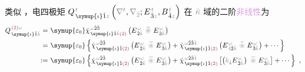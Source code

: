 类似 ，电四极矩 $Q^{\;\!\mathcolor{gray}{t}}_{\;\! \symup{\iota} \hat{1} \mathcolor{gray}{z}} \left( \mathcolor{gray}{\nabla^t}, \mathcolor{gray}{\nabla_{\hat{2}}} ; E^{\;\!\mathcolor{gray}{t}}_{\;\! \hat{3}\mathcolor{gray}{z}}, B^{\;\!\mathcolor{gray}{t}}_{\;\! \hat{4}\mathcolor{gray}{z}} \right)$ 在 $\mathcolor{gray}{\bar{\kappa}}$ 域的二阶\textcolor{Plum}{非线性}为
\begin{subequations}
\begin{align}
	Q^{\;\! \textcolor{Maroon}{(2)} \mathcolor{gray}{\omega}}_{\;\! \symup{\iota} \hat{1} \mathcolor{gray}{\bar{k}}} =&~ {\symup{\varepsilon_0}} \dot{\chi}^{\;\! \mathcolor{gray}{\omega} \hat{2} \hat{3}}_{\;\! \symup{\iota} \hat{1} \mathcolor{gray}{\bar{k}} \textcolor{Maroon}{(2)}} \left( E^{\;\!\mathcolor{gray}{\omega}}_{\;\! \hat{2} \mathcolor{gray}{\bar{k}}} ~\mathcolor{gray}{\widetilde \circledast}~ E^{\;\!\mathcolor{gray}{\omega}}_{\;\! \hat{3} \mathcolor{gray}{\bar{k}}} \right) \\ =&~ {\symup{\varepsilon_0}} \left\{ \dot{\chi}^{\;\! \mathcolor{gray}{\omega} \hat{2} \hat{3}}_{\;\! \symup{\iota} \hat{1} \textcolor{Maroon}{(2)}} \left( E^{\;\!\mathcolor{gray}{\omega}}_{\;\! \hat{2} \mathcolor{gray}{\bar{k}}} ~\mathcolor{gray}{\widetilde \circledast}~ E^{\;\!\mathcolor{gray}{\omega}}_{\;\! \hat{3} \mathcolor{gray}{\bar{k}}} \right) + \dot{\chi}^{\;\! \mathcolor{gray}{\omega} \hat{2} \hat{3} \mathcolor{gray}{\hat{4}}}_{\;\! \symup{\iota} \hat{1} \textcolor{Maroon}{(2)}} \left( E^{\;\!\mathcolor{gray}{\omega}}_{\;\! \mathcolor{gray}{\hat{4}} \hat{2} \mathcolor{gray}{\bar{k}}} ~\mathcolor{gray}{\widetilde \circledast}~ E^{\;\!\mathcolor{gray}{\omega}}_{\;\! \hat{3} \mathcolor{gray}{\bar{k}}} \right) + \cdots \right\} \label{eq:Q(2)_wk}
	\\ :=&~ {\symup{\varepsilon_0}} \left\{ \dot{\chi}^{\;\! \mathcolor{gray}{\omega} \hat{2} \hat{3}}_{\;\! \symup{\iota} \hat{1} \textcolor{Maroon}{(2)}} \left( E^{\;\!\mathcolor{gray}{\omega}}_{\;\! \hat{2} \mathcolor{gray}{\bar{k}}} ~\mathcolor{gray}{\widetilde \circledast}~ E^{\;\!\mathcolor{gray}{\omega}}_{\;\! \hat{3} \mathcolor{gray}{\bar{k}}} \right) + \dot{\chi}^{\;\! \mathcolor{gray}{\omega} \hat{2} \hat{3} \mathcolor{gray}{\hat{4}}}_{\;\! \symup{\iota} \hat{1} \textcolor{Maroon}{(2)}} \left[ \left( \mathcolor{gray}{k_{\hat{4}}} E^{\;\!\mathcolor{gray}{\omega}}_{\;\! \hat{2} \mathcolor{gray}{\bar{k}}} \right) ~\mathcolor{gray}{\widetilde \circledast}~ E^{\;\!\mathcolor{gray}{\omega}}_{\;\! \hat{3} \mathcolor{gray}{\bar{k}}} \right] + \cdots \right\}~,
\end{align}
\end{subequations}
